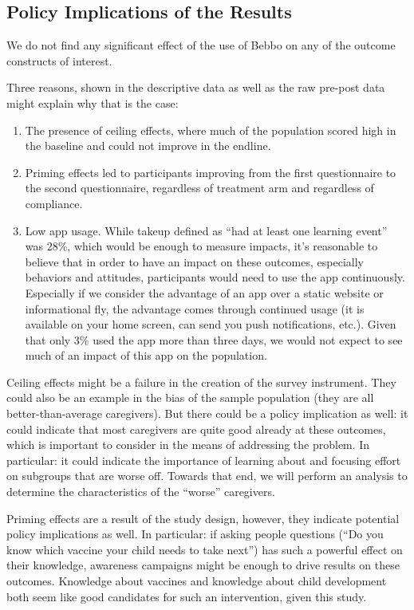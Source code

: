\documentclass{article}
\begin{document}
\subsection*{Policy Implications of the Results}

We do not find any significant effect of the use of Bebbo on any of the outcome constructs of interest.

Three reasons, shown in the descriptive data as well as the raw pre-post data might explain why that is the case:
\begin{enumerate}
\item The presence of ceiling effects, where much of the population scored high in the baseline and could not improve in the endline.
\item Priming effects led to participants improving from the first questionnaire to the second questionnaire, regardless of treatment arm and regardless of compliance.
\item Low app usage. While takeup defined as ``had at least one learning event'' was 28\%, which would be enough to measure impacts, it's reasonable to believe that in order to have an impact on these outcomes, especially behaviors and attitudes, participants would need to use the app continuously. Especially if we consider the advantage of an app over a static website or informational fly, the advantage comes through continued usage (it is available on your home screen, can send you push notifications, etc.). Given that only 3\% used the app more than three days, we would not expect to see much of an impact of this app on the population.
\end{enumerate}

Ceiling effects might be a failure in the creation of the survey instrument. They could also be an example in the bias of the sample population (they are all better-than-average caregivers). But there could be a policy implication as well: it could indicate that most caregivers are quite good already at these outcomes, which is important to consider in the means of addressing the problem. In particular: it could indicate the importance of learning about and focusing effort on subgroups that are worse off. Towards that end, we will perform an analysis to determine the characteristics of the ``worse'' caregivers.

Priming effects are a result of the study design, however, they indicate potential policy implications as well. In particular: if asking people questions (``Do you know which vaccine your child needs to take next'') has such a powerful effect on their knowledge, awareness campaigns might be enough to drive results on these outcomes. Knowledge about vaccines and knowledge about child development both seem like good candidates for such an intervention, given this study.
\end{document}
